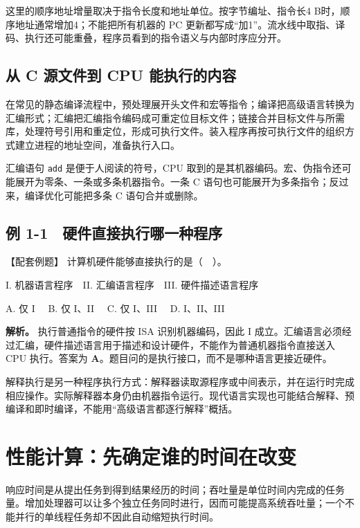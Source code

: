 这里的顺序地址增量取决于指令长度和地址单位。按字节编址、指令长4 B时，顺序地址通常增加4；不能把所有机器的 PC 更新都写成``加1''。流水线中取指、译码、执行还可能重叠，程序员看到的指令语义与内部时序应分开。

\subsection{从 C 源文件到 CPU 能执行的内容}\label{CO01-05}

在常见的静态编译流程中，预处理展开头文件和宏等指令；编译把高级语言转换为汇编形式；汇编把汇编指令编码成可重定位目标文件；链接合并目标文件与所需库，处理符号引用和重定位，形成可执行文件。装入程序再按可执行文件的组织方式建立进程的地址空间，准备执行入口。

汇编语句 \texttt{add} 是便于人阅读的符号，CPU 取到的是其机器编码。宏、伪指令还可能展开为零条、一条或多条机器指令。一条 C 语句也可能展开为多条指令；反过来，编译优化可能把多条 C 语句合并或删除。

\subsection{例 1-1　硬件直接执行哪一种程序}\label{CO01-06}

\begin{example}[配套例题]

【配套例题】 计算机硬件能够直接执行的是（　）。

I. 机器语言程序　II. 汇编语言程序　III. 硬件描述语言程序

A. 仅 I　 B. 仅 I、II　 C. 仅 I、III　 D. I、II、III

\end{example}

\textbf{解析。} 执行普通指令的硬件按 ISA 识别机器编码，因此 I 成立。汇编语言必须经过汇编，硬件描述语言用于描述和设计硬件，不能作为普通机器指令直接送入 CPU 执行。答案为 \textbf{A}。题目问的是执行接口，而不是哪种语言更接近硬件。

解释执行是另一种程序执行方式：解释器读取源程序或中间表示，并在运行时完成相应操作。实际解释器本身仍由机器指令运行。现代语言实现也可能结合解释、预编译和即时编译，不能用``高级语言都逐行解释''概括。

\section{性能计算：先确定谁的时间在改变}\label{CO01-07}

响应时间是从提出任务到得到结果经历的时间；吞吐量是单位时间内完成的任务量。增加处理器可以让多个独立任务同时进行，因而可能提高系统吞吐量；一个不能并行的单线程任务却不因此自动缩短执行时间。

